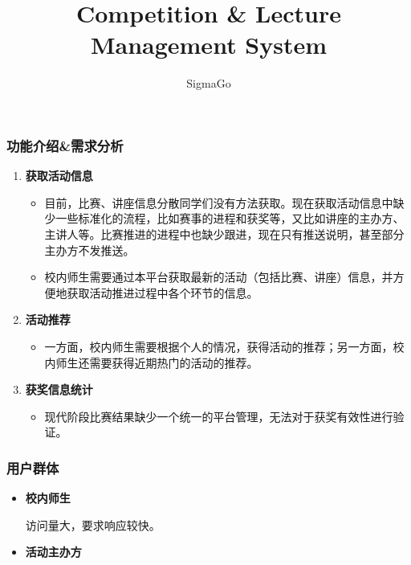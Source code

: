 \documentclass[utf8, a4paper]{beamer}
\author[Software Engineering 2017, Tsinghua University]{SigmaGo}
\title[Competition \& Lecture Management System\hspace{2em}\insertframenumber/\inserttotalframenumber]{Competition \& Lecture Management System
}
\institute{清华大学}
\begin{document}
\begin{CJK}{UTF8}{gbsn}
\maketitle


\begin{frame}
    \frametitle{功能介绍\&需求分析}
    \begin{enumerate}
        \item \textbf{获取活动信息}
            \begin{itemize}
            \item 目前，比赛、讲座信息分散同学们没有方法获取。现在获取活动信息中缺少一些标准化的流程，比如赛事的进程和获奖等，又比如讲座的主办方、主讲人等。比赛推进的进程中也缺少跟进，现在只有推送说明，甚至部分主办方不发推送。
        
            \item 校内师生需要通过本平台获取最新的活动（包括比赛、讲座）信息，并方便地获取活动推进过程中各个环节的信息。
            \end{itemize}
            \pause
        \item \textbf{活动推荐}
            \begin{itemize}
            \item 一方面，校内师生需要根据个人的情况，获得活动的推荐；另一方面，校内师生还需要获得近期热门的活动的推荐。
            \end{itemize}
            
            \pause
        \item \textbf{获奖信息统计}
            \begin{itemize}
            \item 现代阶段比赛结果缺少一个统一的平台管理，无法对于获奖有效性进行验证。
            \end{itemize}
  \end{enumerate}
 
  
  
\end{frame}

\begin{frame}
    \frametitle{用户群体}
  
    \begin{itemize}
    \item \textbf{校内师生}
  
    访问量大，要求响应较快。
  
    \item \textbf{活动主办方}
  

\end{itemize}
\end{frame}
\end{CJK}
\end{document}
